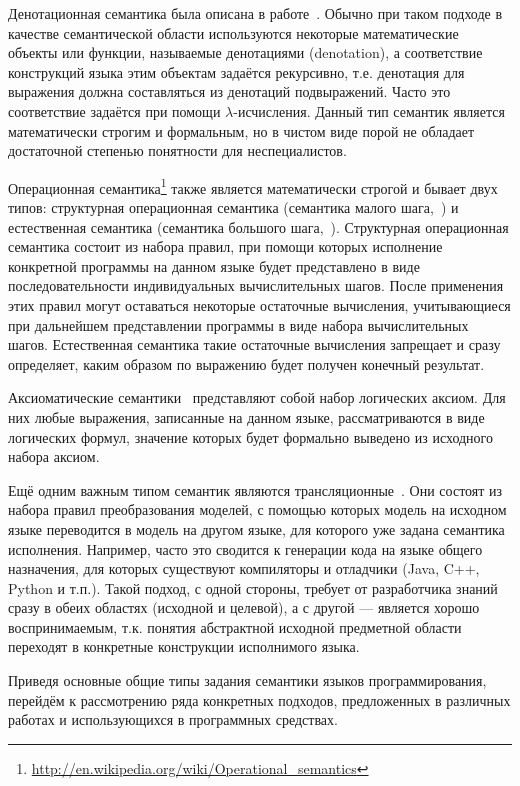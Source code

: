 \documentclass[a5paper]{article}
\begin{document}
Денотационная семантика была описана в работе~\cite{semantics2}. Обычно при таком подходе в качестве семантической области используются некоторые математические объекты или функции, называемые денотациями (denotation), а соответствие конструкций языка этим объектам задаётся рекурсивно, т.е. денотация для выражения должна составляться из денотаций подвыражений. Часто это соответствие задаётся при помощи $\lambda$-исчисления. Данный тип семантик является математически строгим и формальным, но в чистом виде порой не обладает достаточной степенью понятности для неспециалистов.

Операционная семантика\footnote{\url{http://en.wikipedia.org/wiki/Operational_semantics}} также является математически строгой и бывает двух типов: структурная операционная семантика (семантика малого шага,~\cite{semantics1}) и естественная семантика (семантика большого шага,~\cite{plotkin}).  Структурная операционная семантика состоит из набора правил, при помощи которых исполнение конкретной программы на данном языке будет представлено в виде последовательности индивидуальных вычислительных шагов. После применения этих правил могут оставаться некоторые остаточные вычисления, учитывающиеся при дальнейшем представлении программы в виде набора вычислительных шагов. Естественная семантика такие остаточные вычисления запрещает и сразу определяет, каким образом по выражению будет получен конечный результат.

Аксиоматические семантики~\cite{hoare} представляют собой набор логических аксиом. Для них любые выражения, записанные на данном языке, рассматриваются в виде логических формул, значение которых будет формально выведено из исходного набора аксиом.

Ещё одним важным типом семантик являются трансляционные~\cite{translational}. Они состоят из набора правил преобразования моделей, с помощью которых модель на исходном языке переводится в модель на другом языке, для которого уже задана семантика исполнения. Например, часто это сводится к генерации кода на языке общего назначения, для которых существуют компиляторы и отладчики (Java, C++, Python и т.п.). Такой подход, с одной стороны, требует от разработчика знаний сразу в обеих областях (исходной и целевой), а с другой --- является хорошо воспринимаемым, т.к. понятия абстрактной исходной предметной области переходят в конкретные конструкции исполнимого языка.

Приведя основные общие типы задания семантики языков программирования, перейдём к рассмотрению ряда конкретных подходов, предложенных в различных работах и использующихся в программных средствах.
\end{document}
